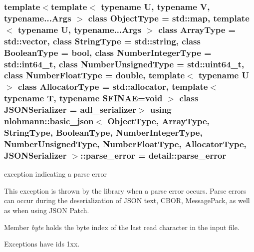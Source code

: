 \subsubsection[{\texorpdfstring{parse\+\_\+error}{parse_error}}]{\setlength{\rightskip}{0pt plus 5cm}template$<$template$<$ typename U, typename V, typename...\+Args $>$ class Object\+Type = std\+::map, template$<$ typename U, typename...\+Args $>$ class Array\+Type = std\+::vector, class String\+Type  = std\+::string, class Boolean\+Type  = bool, class Number\+Integer\+Type  = std\+::int64\+\_\+t, class Number\+Unsigned\+Type  = std\+::uint64\+\_\+t, class Number\+Float\+Type  = double, template$<$ typename U $>$ class Allocator\+Type = std\+::allocator, template$<$ typename T, typename S\+F\+I\+N\+A\+E=void $>$ class J\+S\+O\+N\+Serializer = adl\+\_\+serializer$>$ using {\bf nlohmann\+::basic\+\_\+json}$<$ Object\+Type, Array\+Type, String\+Type, Boolean\+Type, Number\+Integer\+Type, Number\+Unsigned\+Type, Number\+Float\+Type, Allocator\+Type, J\+S\+O\+N\+Serializer $>$\+::{\bf parse\+\_\+error} =  {\bf detail\+::parse\+\_\+error}}\hypertarget{classnlohmann_1_1basic__json_af1efc2468e6022be6e35fc2944cabe4d}{}\label{classnlohmann_1_1basic__json_af1efc2468e6022be6e35fc2944cabe4d}


exception indicating a parse error 

This exception is thrown by the library when a parse error occurs. Parse errors can occur during the deserialization of J\+S\+ON text, C\+B\+OR, Message\+Pack, as well as when using J\+S\+ON Patch.

Member {\itshape byte} holds the byte index of the last read character in the input file.

Exceptions have ids 1xx.


